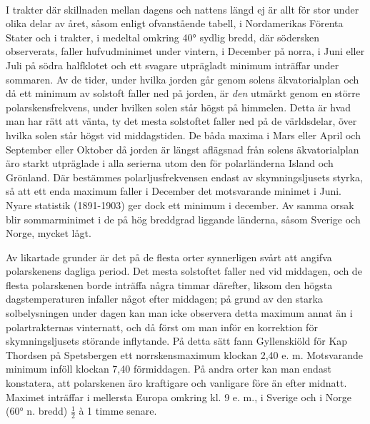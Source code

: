 \documentclass[a4paper, 12pt, oneside, swedish]{article}
\begin{document}
\paragraph{}
I trakter där skillnaden mellan dagens och nattens längd ej är allt för stor under olika delar av året, såsom enligt ofvanstående tabell, i Nordamerikas Förenta Stater och i trakter, i medeltal omkring 40° sydlig bredd, där södersken observerats, faller hufvudminimet under vintern, i December på norra, i Juni eller Juli på södra halfklotet och ett svagare utprägladt minimum inträffar under sommaren. Av de tider, under hvilka jorden går genom solens äkvatorialplan och då ett minimum av solstoft faller ned på jorden, är \emph{den} utmärkt genom en större polarskensfrekvens, under hvilken solen står högst på himmelen. Detta är hvad man har rätt att vänta, ty det mesta solstoftet faller ned på de världsdelar, över hvilka solen står högst vid middagstiden. De båda maxima i Mars eller April och September eller Oktober då jorden är längst aflägsnad från solens äkvatorialplan äro starkt utpräglade i alla serierna utom den för polarländerna Island och Grönland. Där bestämmes polarljusfrekvensen endast av skymningsljusets styrka, så att ett enda maximum faller i December det motsvarande minimet i Juni. Nyare statistik (1891-1903) ger dock ett minimum i december. Av samma orsak blir sommarminimet i de på hög breddgrad liggande länderna, såsom Sverige och Norge, mycket lågt.

Av likartade grunder är det på de flesta orter synnerligen svårt att angifva polarskenens dagliga period. Det mesta solstoftet faller ned vid middagen, och de flesta polarskenen borde inträffa några timmar därefter, liksom den högsta dagstemperaturen infaller något efter middagen; på grund av den starka solbelysningen under dagen kan man icke observera detta maximum annat än i polartrakternas vinternatt, och då först om man inför en korrektion för skymningsljusets störande inflytande. På detta sätt fann Gyllenskiöld för Kap Thordsen på Spetsbergen ett norrskensmaximum klockan 2,40 e. m. Motsvarande minimum inföll klockan 7,40 förmiddagen. På andra orter kan man endast konstatera, att polarskenen äro kraftigare och vanligare före än efter midnatt. Maximet inträffar i mellersta Europa omkring kl. 9 e. m., i Sverige och i Norge (60° n. bredd) $\frac{1}{2}$ à 1 timme senare.
\end{document}
